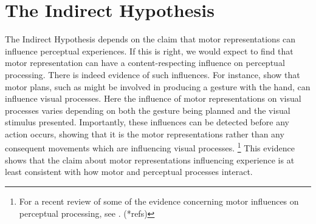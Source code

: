 \documentclass[12pt,\papersize]{extarticle}
\begin{document}
\section{The Indirect Hypothesis}
The Indirect Hypothesis depends on the claim that motor representations can influence perceptual experiences.  If this is right, we would expect to find that motor representation can have a content-respecting influence on perceptual processing. There is indeed evidence of such influences. For instance, \citet{bortoletto:2011_action} show that motor plans, such as might be involved in producing a gesture with the hand, can influence visual processes. Here the influence of motor representations on visual processes varies depending on both the gesture being planned and the visual stimulus presented. Importantly, these influences can be detected before any action occurs, showing that it is the motor representations rather than any consequent movements which are influencing visual processes.%
\footnote{
For a recent review of some of the evidence concerning motor influences on perceptual processing, see \citet{halasz:2012_unconscious}. (*refs)
}  
This evidence shows that the claim about motor representations influencing experience is at least consistent with how motor and perceptual processes interact.
\end{document}
